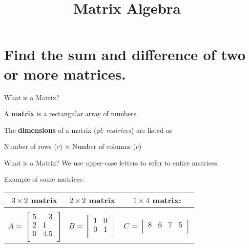\documentclass[t]{beamer}
\title{Matrix Algebra}
\author{}
\date{}
\begin{document}
\begin{frame} 
\maketitle
\end{frame}

\section{Find the sum and difference of two or more matrices.}

\begin{frame}{What is a Matrix?}
\begin{tcolorbox}[colback=red!20!white, colframe=red!30!black, title=\textbf{Matrix}]
A \textbf{matrix} is a rectangular array of numbers.
\end{tcolorbox}
\vspace{10pt} \pause

\begin{tcolorbox}[colback=red!20!white, colframe=red!30!black, title=\textbf{Matrix Dimensions}]
The \textbf{dimensions} of a matrix (\textit{pl: matrices}) are listed as
\begin{center}
Number of rows ($r$) $\times$ Number of columns ($c$)	
\end{center}	
\end{tcolorbox}
\end{frame}

\begin{frame}{What is a Matrix?}
We use upper-case letters to refer to entire matrices. \newline\\	\pause

Example of some matrices:	\newline\\
\begin{tabular}{c|c|c}
    $3 \times 2$ matrix &   $2 \times 2$ matrix   &   $1 \times 4$ matrix: \\    \hline
        &   &   \\
    $A = \begin{bmatrix}
    5   &   -3  \\
    2   &   1   \\
    0   &   4.5 \\
    \end{bmatrix}$
    &
    $B = \begin{bmatrix}
    1   &   0   \\
    0   &   1   \\
    \end{bmatrix}$
    &
    $C = \begin{bmatrix}
    8   &   6   &   7   &   5   \\
    \end{bmatrix}$
\end{tabular}
\end{frame}
\end{document}
